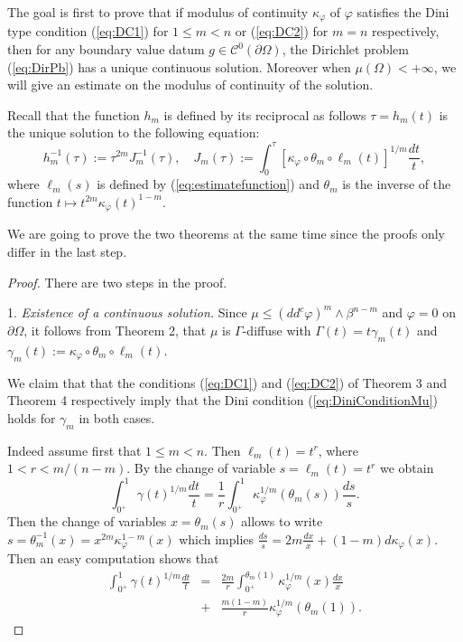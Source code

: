 \documentclass[12pt]{amsart}
\theoremstyle{definition}
\numberwithin{theorem}{section}
\numberwithin{equation}{section}
\begin{document}
{The goal is first to prove that if modulus of continuity  $\kappa_\varphi$ of $\varphi$ satisfies the  Dini type condition (\ref{eq:DC1}) for $1 \leq m < n$  or (\ref{eq:DC2}) for $m=n$  respectively, then  for any boundary value datum $g \in \mathcal C^0 (\partial \Omega)$, the Dirichlet problem (\ref{eq:DirPb}) has a unique continuous solution.
Moreover  when $\mu (\Omega) < + \infty$, we will give an estimate on the modulus of continuity of the solution.

Recall that the function $ h_m $ is defined by its  reciprocal as follows $\tau = h_m (t)$ is the unique solution to the following equation:
\begin{equation} \label {eq:hm}
 h_m^{-1} (\tau) := \tau^{2m} J^{-1}_m (\tau), \, \, \, \, \, \, J_m (\tau) :=  \int_0^\tau \left[\kappa_\varphi \circ \theta_m \circ \ell_m (t)\right]^{1 \slash m} \frac{d t}{t},
 \end{equation}
where $\ell_m (s)$ is defined by (\ref{eq:estimatefunction}) and $\theta_m$ is the inverse of the function $t \longmapsto t^{2m} \kappa_\varphi(t)^{1 - m} $.
  
We are going to prove the two theorems at the same time since the proofs only differ in the last step.

\begin{proof}  There are two steps in the proof.

1. {\it Existence of a continuous solution.} 
 Since $\mu\leq (dd^c\varphi)^m\wedge\beta^{n-m}$ and $\varphi = 0$ on $\partial \Omega$,   it follows from Theorem 2,  that $\mu$ is $\Gamma$-diffuse with $\Gamma (t) = t \gamma_m (t)$ and $\gamma_m (t) :=  \kappa_\varphi \circ \theta_m \circ \ell_m (t)$.
 
We claim that that  the conditions (\ref{eq:DC1}) and (\ref{eq:DC2}) of Theorem 3 and Theorem 4 respectively  imply that the Dini condition (\ref{eq:DiniConditionMu}) holds for $\gamma_m$ in both cases.

Indeed assume first that $1 \leq m < n$. Then $\ell_m (t) = t^r$, where $1 < r < m \slash (n-m)$. By the change of variable $s = \ell_m(t) = t^r$ we obtain
$$
\int_{0^+}^1 \gamma (t)^{1 \slash m} \frac{d t}{t} = \frac{1}{r} \int_{0^+}^1 \kappa_\varphi^{1 \slash m} (\theta_m (s)) \frac{d s}{s}.
$$
 Then the change of variables $x = \theta_m (s)$ allows to write $s = \theta_m^{-1} (x) = x^{2 m} \kappa_\varphi^{1 - m} (x)$ which implies $\frac{d s}{s} = 2 m \frac{dx}{x} + (1-m) d \kappa_\varphi (x).$
Then an easy computation shows that 
\begin{eqnarray*}
\int_{0^+}^1 \gamma (t)^{1 \slash m} \frac{d t}{t} &= & \frac{2 m }{r} \int_{0^+}^{\theta_m(1)} \kappa_\varphi^{1 \slash m} (x) \frac{d x}{x}  \\
&+ & \frac{ m(1-m)  }{r}\kappa_\varphi^{1 \slash m}(\theta_m(1)). 
\end{eqnarray*}


\end{proof}}
\end{document}
